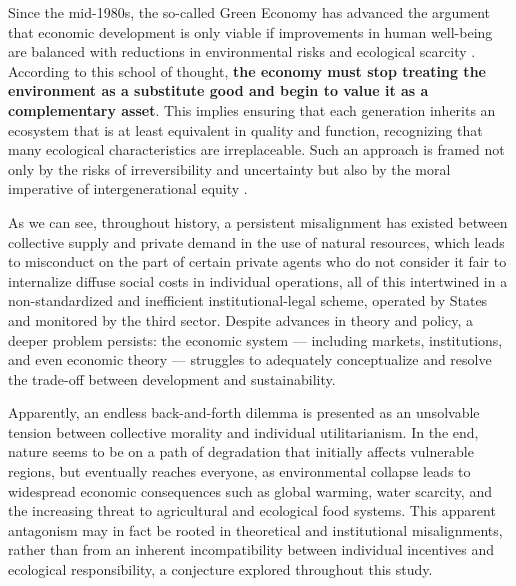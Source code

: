 Since the mid-1980s, the so-called Green Economy has advanced the argument that economic development is only viable if improvements in human well-being are balanced with reductions in environmental risks and ecological scarcity \cite{jacobs1991green}. According to this school of thought, \textbf{the economy must stop treating the environment as a substitute good and begin to value it as a complementary asset}. This implies ensuring that each generation inherits an ecosystem that is at least equivalent in quality and function, recognizing that many ecological characteristics are irreplaceable. Such an approach is framed not only by the risks of irreversibility and uncertainty but also by the moral imperative of intergenerational equity \cite{pearce1989blueprint}.

As we can see, throughout history, a persistent misalignment has existed between collective supply and private demand in the use of natural resources, which leads to misconduct on the part of certain private agents who do not consider it fair to internalize diffuse social costs in individual operations, all of this intertwined in a non-standardized and inefficient institutional-legal scheme, operated by States and monitored by the third sector. Despite advances in theory and policy, a deeper problem persists: the economic system — including markets, institutions, and even economic theory — struggles to adequately conceptualize and resolve the trade-off between development and sustainability. 

Apparently, an endless back-and-forth dilemma is presented as an unsolvable tension between collective morality and individual utilitarianism. In the end, nature seems to be on a path of degradation that initially affects vulnerable regions, but eventually reaches everyone, as environmental collapse leads to widespread economic consequences such as global warming, water scarcity, and the increasing threat to agricultural and ecological food systems. This apparent antagonism may in fact be rooted in theoretical and institutional misalignments, rather than from an inherent incompatibility between individual incentives and ecological responsibility, a conjecture explored throughout this study.